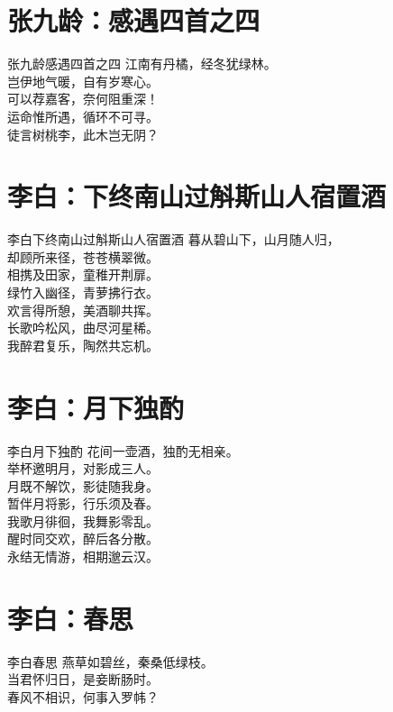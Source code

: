 \documentclass[12pt,oneside,a5paper]{book}
\begin{document}
\chapter{张九龄：感遇四首之四}
\begin{poemzh}{张九龄}{感遇四首之四}
江南有丹橘，经冬犹绿林。\\
岂伊地气暖，自有岁寒心。\\
可以荐嘉客，奈何阻重深！\\
运命惟所遇，循环不可寻。\\
徒言树桃李，此木岂无阴？\\ 
\end{poemzh}

\chapter{李白：下终南山过斛斯山人宿置酒}
\begin{poemzh}{李白}{下终南山过斛斯山人宿置酒}
暮从碧山下，山月随人归，\\
却顾所来径，苍苍横翠微。\\
相携及田家，童稚开荆扉。\\
绿竹入幽径，青萝拂行衣。\\
欢言得所憩，美酒聊共挥。\\
长歌吟松风，曲尽河星稀。\\
我醉君复乐，陶然共忘机。\\ 
\end{poemzh}

\chapter{李白：月下独酌}
\begin{poemzh}{李白}{月下独酌}
花间一壶酒，独酌无相亲。\\
举杯邀明月，对影成三人。\\
月既不解饮，影徒随我身。\\
暂伴月将影，行乐须及春。\\
我歌月徘徊，我舞影零乱。\\
醒时同交欢，醉后各分散。\\
永结无情游，相期邈云汉。\\ 
\end{poemzh}

\chapter{李白：春思}
\begin{poemzh}{李白}{春思}
燕草如碧丝，秦桑低绿枝。\\
当君怀归日，是妾断肠时。\\
春风不相识，何事入罗帏？\\ 
\end{poemzh}
\end{document}
